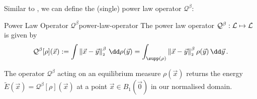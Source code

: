 Similar to , we can define the (single) power law operator $\mathcal{Q}^\beta$:

\begin{definition}{Power Law Operator $\mathcal{Q}^\beta$}{power-law-operator}
  The power law operator $\mathcal{Q}^\beta: \mathcal{L} \mapsto \mathcal{L}$ is given by
  $$\mathcal{Q}^\beta[\rho](\vec{x}) := \int \norm{\vec{x}-\vec{y}}^\beta \,\dd\rho(\vec{y}) = \int_{\supp(\rho)} \norm{\vec{x}-\vec{y}}^\beta \rho(\vec{y}) \,\dd\vec{y}\,.$$
\end{definition}

The operator $\mathcal{Q}^\beta$ acting on an equilibrium measure $\rho(\vec{x})$ returns the energy $\tilde{E}(\vec{x}) = \mathcal{Q}^\beta[\rho](\vec{x})$ at a point $\vec{x} \in B_1(\vec{0})$ in our normalised domain.
